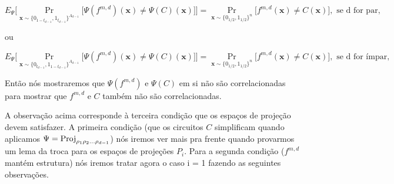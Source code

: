 \begin{equation} \label{uniform_comp_eq_1}
	E_{\Psi} \bigg[ \Pr_{\textbf{x} \sim \{0_{1 - t_{d - 1}}, 1_{t_{d - 1}}\}^{A_{d - 1}}} \big[ \Psi(f^{m, d})(\textbf{x}) \neq \Psi(C)(\textbf{x}) \big] \bigg] = \Pr_{\textbf{x} \sim \{0_{1/2}, 1_{1/2}\}^{n}} \big[ f^{m, d}(\textbf{x}) \neq C(\textbf{x}) \big], \text{ se d for par},
\end{equation}

ou

\begin{equation} \label{uniform_comp_eq_2}
	E_{\Psi} \bigg[ \Pr_{\textbf{x} \sim \{0_{t_{d - 1}}, 1_{1 - t_{d - 1}}\}^{A_{d - 1}}} \big[ \Psi(f^{m, d})(\textbf{x}) \neq \Psi(C)(\textbf{x}) \big] \bigg] = \Pr_{\textbf{x} \sim \{0_{1/2}, 1_{1/2}\}^{n}} \big[f^{m, d}(\textbf{x}) \neq C(\textbf{x}) \big], \text{ se d for ímpar},
\end{equation}

Então nós mostraremos que $\Psi(f^{m, d})$ e $\Psi(C)$ em si não são correlacionadas para mostrar que $f^{m, d}$ e $C$ também não são correlacionadas.

A observação acima corresponde à terceira condição que os espaços de projeção devem satisfazer. A primeira condição (que os circuitos $C$ simplificam quando aplicamos $\Psi = \text{Proj}_{\rho_{1}\rho_{2}\dots\rho_{d - 1}}$) nós iremos ver mais pra frente quando provarmos um lema da troca para os espaços de projeções $P_{i}$. Para a segunda condição ($f^{m, d}$ mantém estrutura) nós iremos tratar agora o caso i = 1 fazendo as seguintes observações.

